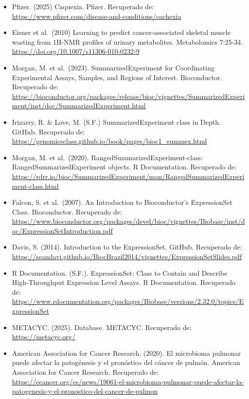 \documentclass[
]{article}
\begin{document}
\begin{itemize}
\item
  Pfizer. (2025) Caquexia. Pfizer. Recuperado de:
  \url{https://www.pfizer.com/disease-and-conditions/cachexia}
\item
  Eisner et al.~(2010) Learning to predict cancer-associated skeletal
  muscle wasting from 1H-NMR profiles of urinary metabolites.
  Metabolomics 7:25-34. \url{https://doi.org/10.1007/s11306-010-0232-9}
\item
  Morgan, M. et al.~(2023). SummarizedExperiment for Coordinating
  Experimental Assays, Samples, and Regions of Interest. Bioconductor.
  Recuperado de:
  \url{https://bioconductor.org/packages/release/bioc/vignettes/SummarizedExperiment/inst/doc/SummarizedExperiment.html}
\item
  Irizarry, R. \& Love, M. (S.F.) SummarizedExperiment class in Depth.
  GitHub. Recuperado de:
  \url{https://genomicsclass.github.io/book/pages/bioc1_summex.html}
\item
  Morgan, M. et al.~(2020). RangedSummarizedExperiment-class:
  RangedSummarizedExperiment objects. R Documentation. Recuperado de:
  \url{https://rdrr.io/bioc/SummarizedExperiment/man/RangedSummarizedExperiment-class.html}
\item
  Falcon, S. et al.~(2007). An Introduction to Bioconductor's
  ExpressionSet Class. Bioconductor. Recuperado de:
  \url{https://www.bioconductor.org/packages/devel/bioc/vignettes/Biobase/inst/doc/ExpressionSetIntroduction.pdf}
\item
  Davis, S. (2014). Introduction to the ExpressionSet. GitHub.
  Recuperado de:
  \url{https://seandavi.github.io/BiocBrazil2014/vignettes/ExpressionSetSlides.pdf}
\item
  R Documentation. (S.F.). ExpressionSet: Class to Contain and Describe
  High-Throughput Expression Level Assays. R Documentation. Recuperado
  de:
  \url{https://www.rdocumentation.org/packages/Biobase/versions/2.32.0/topics/ExpressionSet}
\item
  METACYC. (2025). Database. METACYC. Recuperado de:
  \url{https://metacyc.org/}
\item
  American Association for Cancer Research. (2020). El microbioma
  pulmonar puede afectar la patogénesis y el pronóstico del cáncer de
  pulmón. American Association for Cancer Research. Recuperado de:
  \url{https://ecancer.org/es/news/19061-el-microbioma-pulmonar-puede-afectar-la-patogenesis-y-el-pronostico-del-cancer-de-pulmon}
\end{itemize}
\end{document}
